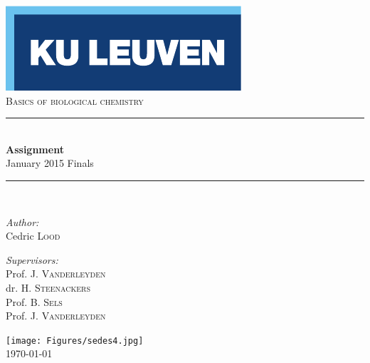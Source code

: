 \begin{titlepage}
  \begin{center}
    
    \includegraphics[scale=1.5]{Figures/kuleuven_logo.pdf}~\\[4.5cm]
    
    \textsc{\Large Basics of biological chemistry}\\[0.5cm]
    
    \rule{\linewidth}{0.3mm}\\[0.4cm]
    {\huge \bfseries Assignment} \\[0.4cm]
    {\large January 2015 Finals} \\[0.4cm]
    \rule{\linewidth}{0.3mm}\\[1.5cm]
    
    \begin{minipage}{0.4\textwidth}
      \begin{flushleft} \large
        \emph{Author:}\\
        Cedric \textsc{Lood}\\
      \end{flushleft}
    \end{minipage}
    \begin{minipage}{0.4\textwidth}
      \begin{flushright} \large
        \emph{Supervisors:} \\
        Prof. J. \textsc{Vanderleyden}\\
        dr. H. \textsc{Steenackers}\\
        Prof. B. \textsc{Sels}\\
        Prof. J. \textsc{Vanderleyden}
      \end{flushright}
    \end{minipage}
    
    \vfill
    
    \texttt{[image: Figures/sedes4.jpg]}~\\[0.5cm]

    {\large \today}
    
  \end{center}
\end{titlepage}
